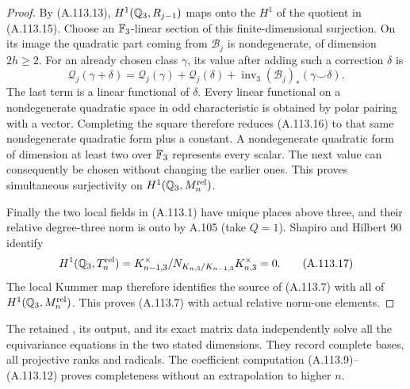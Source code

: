 \begin{proof}
By (A.113.13), $H^1(\mathbb Q_3,R_{j-1})$ maps onto the
$H^1$ of the quotient in (A.113.15).
Choose an $\mathbb F_3$-linear section of this finite-dimensional
surjection.  On its image the quadratic part coming from
$\mathcal B_j$ is nondegenerate, of dimension $2h\ge2$.
For an already chosen class $\gamma$, its value after adding
such a correction $\delta$ is
\[
 \mathcal Q_j(\gamma+\delta)
   =\mathcal Q_j(\gamma)+\mathcal Q_j(\delta)
       +\operatorname{inv}_3
                      (\mathcal B_j)_*(\gamma\smile\delta).
 \tag{A.113.16}
\]
The last term is a linear functional of $\delta$.
Every linear functional on a nondegenerate quadratic space
in odd characteristic is obtained by polar pairing with a
vector.  Completing the square therefore reduces
(A.113.16) to that same nondegenerate quadratic form plus
a constant.  A nondegenerate quadratic form of dimension
at least two over $\mathbb F_3$ represents every scalar.
The next value can consequently be chosen without changing
the earlier ones.  This proves simultaneous surjectivity
on $H^1(\mathbb Q_3,M_n^{\rm rel})$.

Finally the two local fields in (A.113.1) have unique
places above three, and their relative degree-three
norm is onto by A.105 (take $Q=1$).
Shapiro and Hilbert 90 identify
\[
 H^1(\mathbb Q_3,T_n^{\rm rel})
    =K_{n-1,3}^{\times}/N_{K_{n,3}/K_{n-1,3}}K_{n,3}^{\times}=0.
 \tag{A.113.17}
\]
The local Kummer map therefore identifies the source of
(A.113.7) with all of $H^1(\mathbb Q_3,M_n^{\rm rel})$.
This proves (A.113.7) with actual relative norm-one elements.
\end{proof}

The retained ,
its output, and its exact matrix data independently solve all
the equivariance equations in the two stated dimensions.
They record complete bases, all projective ranks and radicals.
The coefficient computation (A.113.9)--(A.113.12) proves
completeness without an extrapolation to higher $n$.
